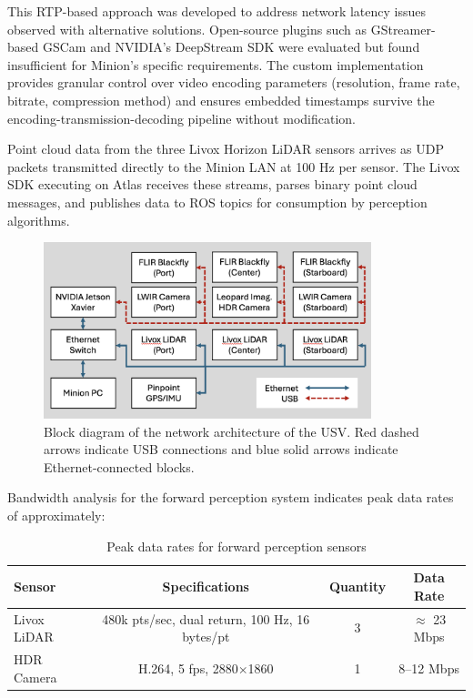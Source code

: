 This \ac{RTP}-based approach was developed to address network latency issues observed with alternative solutions. Open-source plugins such as GStreamer-based GSCam and NVIDIA's DeepStream SDK were evaluated but found insufficient for Minion's specific requirements. The custom implementation provides granular control over video encoding parameters (resolution, frame rate, bitrate, compression method) and ensures embedded timestamps survive the encoding-transmission-decoding pipeline without modification.

Point cloud data from the three Livox Horizon \ac{LiDAR} sensors arrives as \ac{UDP} packets transmitted directly to the Minion LAN at 100 Hz per sensor. The Livox SDK executing on Atlas receives these streams, parses binary point cloud messages, and publishes data to \ac{ROS} topics for consumption by perception algorithms. 

\begin{figure}[htbp]
    \centering
    \includegraphics[width=0.85\textwidth]{Images/network_diagram.png}
    \caption{Block diagram of the network architecture of the \ac{USV}. Red dashed arrows indicate USB connections and blue solid arrows indicate Ethernet-connected blocks.}
    \label{fig:network_diag}
\end{figure}

Bandwidth analysis for the forward perception system indicates peak data rates of approximately:

\begin{table}[htbp]
\centering
\caption{Peak data rates for forward perception sensors}
\label{tab:network_bandwidth}
\begin{tabular}{lccc}
\hline
\textbf{Sensor} & \textbf{Specifications} & \textbf{Quantity} & \textbf{Data Rate} \\
\hline
Livox \ac{LiDAR} & 480k pts/sec, dual return, 100 Hz, 16 bytes/pt & 3 & $\approx$ 23 Mbps \\
HDR Camera & H.264, 5 fps, 2880$\times$1860 & 1 & 8--12 Mbps \\
\hline
\end{tabular}
\end{table}


